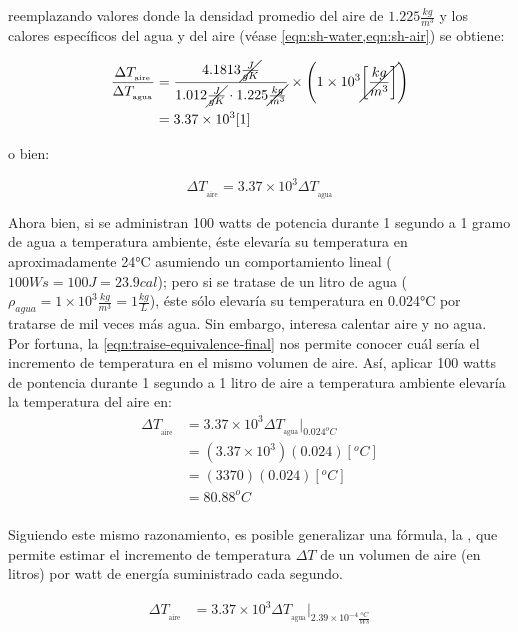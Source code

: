 \noindent reemplazando valores donde la densidad promedio del aire de $1.225\frac{kg}{m^3}$ y los calores específicos del agua y del aire (véase \cref{eqn:sh-water,eqn:sh-air}) se obtiene:

\begin{align*}
	\frac{\Delta T_{_\text{aire}}}{\Delta T_{_\text{agua}}} &=
	\frac{4.1813\cancel{\frac{J}{gK}}}%
	{1.012\cancel{\frac{J}{gK}}\cdot 1.225\cancel{\frac{kg}{m^3}}}
	\times
	\left(1\times10^3\cancel{\left[\frac{kg}{m^3}\right]}\right)\\
	&=3.37\times10^3[1]
\end{align*}

\noindent o bien:

\begin{equation}
\label{eqn:traise-equivalence-final}
	\Delta T_{_\text{aire}} = 3.37\times10^3 \Delta T_{_\text{agua}}
\end{equation}

Ahora bien, si se administran 100 watts de potencia durante 1 segundo a 1 gramo de agua a temperatura ambiente, éste elevaría su temperatura en aproximadamente 24°C asumiendo un comportamiento lineal ($100Ws = 100J = 23.9cal$); pero si se tratase de un litro de agua ($\rho_{agua} = 1\times10^3\frac{kg}{m^3} = 1\frac{kg}{L}$), éste sólo elevaría su temperatura en 0.024°C por tratarse de mil veces más agua.
Sin embargo, interesa calentar aire y no agua.
Por fortuna, la \cref{eqn:traise-equivalence-final} nos permite conocer cuál sería el incremento de temperatura en el mismo volumen de aire.
Así, aplicar 100 watts de pontencia durante 1 segundo a 1 litro de aire a temperatura ambiente elevaría la temperatura del aire en:
\begin{align*}
	\Delta T_{_\text{aire}}
	&= 3.37\times10^3 \Delta T_{_\text{agua}}\bigg\rvert_{0.024^{o}C}\\
	&= (3.37\times10^3)(0.024)\left[^{o}C\right]\\
	&= (3370)(0.024)\left[^{o}C\right]\\
	&= 80.88^{o}C\\
\end{align*}

Siguiendo este mismo razonamiento, es posible generalizar una fórmula, la , que permite estimar el incremento de temperatura $\Delta T$ de un volumen de aire (en litros) por watt de energía suministrado cada segundo.

\begin{align*}
	\Delta T_{_\text{aire}}
	&= 3.37\times10^3 \Delta T_{_\text{agua}}\bigg\rvert_{2.39\times10^{-4}\frac{^{o}C}{Ws}}\\
\end{align*}

